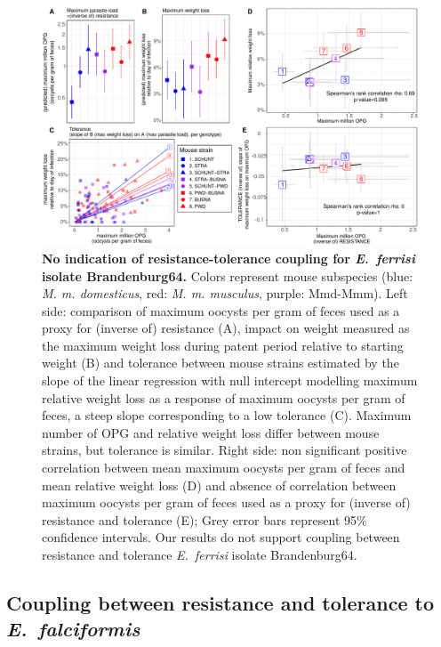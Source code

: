 \begin{figure}[H]
    \centering
    \includegraphics[width=\linewidth,height=\textheight,keepaspectratio]{images/3article2/Fig4_final.pdf}
    \caption{\textbf{No indication of resistance-tolerance coupling for \textit{E.~ferrisi} isolate Brandenburg64.} Colors represent mouse subspecies (blue: \textit{M. m. domesticus}, red: \textit{M. m. musculus}, purple: Mmd-Mmm). Left side: comparison of maximum oocysts per gram of feces used as a proxy for (inverse of) resistance (A), impact on weight measured as the maximum weight loss during patent period relative to starting weight (B) and tolerance between mouse strains estimated by the slope of the linear regression with null intercept modelling maximum relative weight loss as a response of maximum oocysts per gram of feces, a steep slope corresponding to a low tolerance (C). Maximum number of OPG and relative weight loss differ between mouse strains, but tolerance is similar. Right side: non significant positive correlation between mean maximum oocysts per gram of feces and mean relative weight loss (D) and absence of correlation between maximum oocysts per gram of feces used as a proxy for (inverse of) resistance and tolerance (E); Grey error bars represent 95\% confidence intervals. Our results do not support coupling between resistance and tolerance \textit{E.~ferrisi} isolate Brandenburg64.}
\end{figure}

\subsection{Coupling between resistance and tolerance to \textit{E.~falciformis}}

